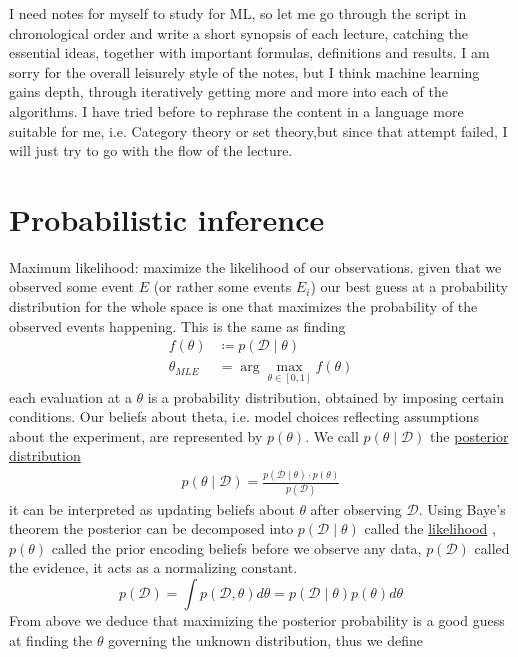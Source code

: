 \documentclass[12 pt]{article}        	%
\begin{document}
    
I need notes for myself to study for ML, so let me go through the script in chronological order and write a short synopsis of each lecture, catching the essential ideas, together with important formulas, definitions and results.
I am sorry for the overall leisurely style of the notes, but I think machine learning gains depth, through iteratively getting more and more into each
of the algorithms.
I have tried before to rephrase the content in a language more suitable for me, i.e. Category theory or set theory,but since that attempt failed, I will just try to go with the flow of the lecture.

\section{Probabilistic inference}
Maximum likelihood: maximize the likelihood of our observations.
given that we observed some event $ E $ (or rather some events $ E_i $) our best guess
at a probability distribution for the whole space is one that maximizes the probability 
of the observed events happening.
This is the same as finding 
\begin{align*}
    f ( \theta ) &\coloneqq p ( \mathcal{ D } \mid \theta )
    \\
    \theta_{ MLE } &= \arg \max_{ \theta \in [ 0 , 1 ] } f ( \theta )
\end{align*}
each evaluation at a $ \theta $ is a probability distribution, obtained by imposing certain conditions.
Our beliefs about theta, i.e. model choices reflecting assumptions about the experiment, 
are represented by $ p ( \theta ) $.
We call $ p ( \theta \mid \mathcal{ D } ) $ the \underline{posterior distribution}
\begin{align*}
    p ( \theta \mid \mathcal{ D } ) = \frac{ p ( \mathcal{ D } \mid \theta ) \cdot p ( \theta ) }{ p ( \mathcal{ D } ) }
\end{align*}
it can be interpreted as updating beliefs about $ \theta $ after observing $ \mathcal{ D } $.
Using Baye's theorem the posterior can be decomposed into $ p ( \mathcal{ D } \mid \theta ) $ called the \underline{likelihood} , $ p( \theta ) $ called the prior encoding beliefs before we observe any data, $ p ( \mathcal{ D } ) $ called the evidence, it acts as a normalizing constant.
\[
    p ( \mathcal{ D } ) = \int p ( \mathcal{ D , \theta } ) d \theta  = p ( \mathcal{ D } \mid \theta ) p( \theta ) d \theta 
\]
From above we deduce that maximizing the posterior probability is a good guess at finding the $ \theta $ governing the unknown distribution, thus we define
\end{document}
